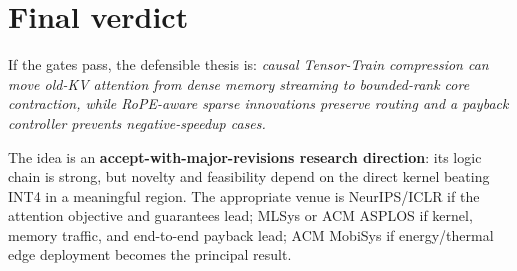\documentclass[11pt]{article}
\begin{document}
\section{Final verdict}

\begin{claimbox}
If the gates pass, the defensible thesis is: \emph{causal Tensor-Train compression can move old-KV
attention from dense memory streaming to bounded-rank core contraction, while RoPE-aware sparse
innovations preserve routing and a payback controller prevents negative-speedup cases.}
\end{claimbox}

The idea is an \textbf{accept-with-major-revisions research direction}: its logic chain is strong,
but novelty and feasibility depend on the direct kernel beating INT4 in a meaningful region. The
appropriate venue is NeurIPS/ICLR if the attention objective and guarantees lead; MLSys or ACM
ASPLOS if kernel, memory traffic, and end-to-end payback lead; ACM MobiSys if energy/thermal edge
deployment becomes the principal result.
\end{document}
